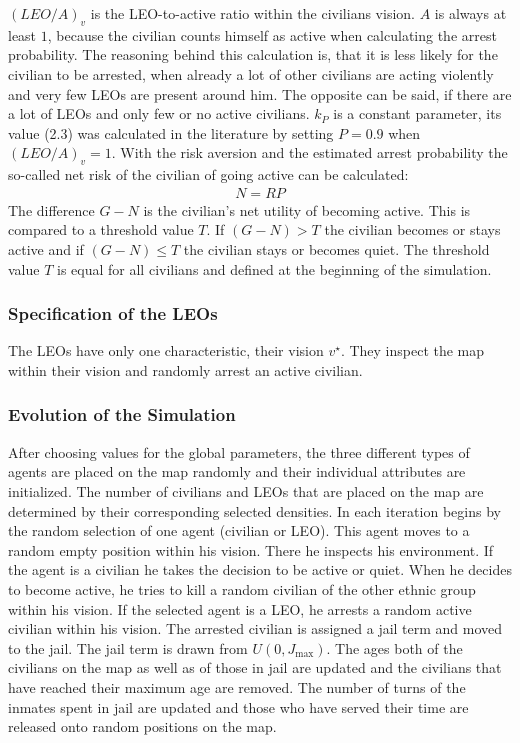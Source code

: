 \documentclass[11pt]{article}
\begin{document}
$\left(LEO/A\right)_v$ is the LEO-to-active ratio within the civilians vision. $A$ is always at least $1$, because the civilian counts himself as active when calculating the arrest probability. The reasoning behind this calculation is, that it is less likely for the civilian to be arrested, when already a lot of other civilians are acting violently and very few LEOs are present around him. The opposite can be said, if there are a lot of LEOs and only few or no active civilians. $k_P$ is a constant parameter, its value (2.3) was calculated in the literature by setting $P = 0.9$ when $\left(LEO/A\right)_v = 1$. With the risk aversion and the estimated arrest probability the so-called net risk of the civilian of going active can be calculated:
\begin{align}
N = RP
\end{align}
The difference $G - N$ is the civilian's net utility of becoming active. This is compared to a threshold value $T$. If $(G - N) > T$ the civilian becomes or stays active and if $(G - N) \leq T$ the civilian stays or becomes quiet. The threshold value $T$ is equal for all civilians and defined at the beginning of the simulation.

\subsubsection{Specification of the LEOs}
The LEOs have only one characteristic, their vision $v^\star$. They inspect the map within their vision and randomly arrest an active civilian.

\subsubsection{Evolution of the Simulation}
After choosing values for the global parameters, the three different types of agents are placed on the map randomly and their individual attributes are initialized. The number of civilians and LEOs that are placed on the map are determined by their corresponding selected densities. In each iteration begins by the random selection of one agent (civilian or LEO). This agent moves to a random empty position within his vision. There he inspects his environment. If the agent is a civilian he takes the decision to be active or quiet. When he decides to become active, he tries to kill a random civilian of the other ethnic group within his vision. If the selected agent is a LEO, he arrests a random active civilian within his vision. The arrested civilian is assigned a jail term and moved to the jail. The jail term is drawn from $U(0,J_{\text{max}})$. The ages both of the civilians on the map as well as of those in jail are updated and the civilians that have reached their maximum age are removed. The number of turns of the inmates spent in jail are updated and those who have served their time are released onto random positions on the map.
\end{document}

